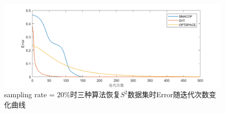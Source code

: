\begin{figure}[h]
	\centering
	\includegraphics[width=1.0\textwidth]{figure/SphereError.png}
	\caption{sampling rate = $20\%$时三种算法恢复$S^2$数据集时Error随迭代次数变化曲线}
 	\label{fig:sphere_error}
\end{figure}